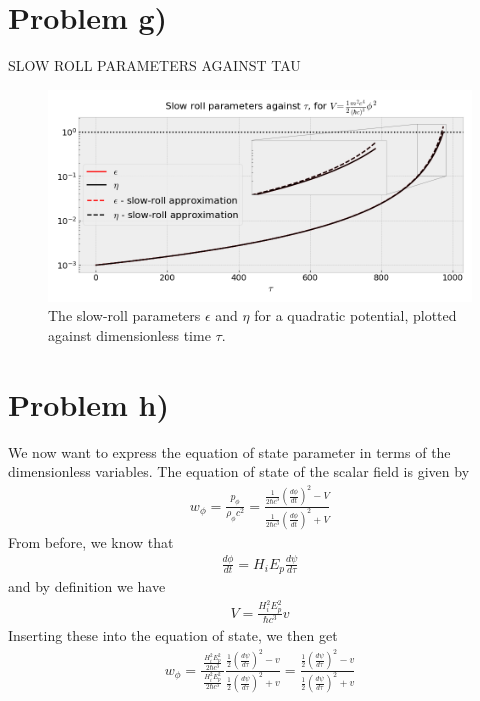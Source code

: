 \documentclass[reprint,english,notitlepage]{revtex4-1}  %
\numberwithin{equation}{section}
\begin{document}
\section{Problem g)}
SLOW ROLL PARAMETERS AGAINST TAU
\begin{figure}[h!]
	\includegraphics[width=\linewidth]{QuadraticPotential_slowroll-tau.png}
	\caption{The slow-roll parameters $\epsilon$ and $\eta$ for a quadratic potential,
	plotted against dimensionless time $\tau$.}
	\label{}
\end{figure}

\section{Problem h)}
We now want to express the equation of state parameter in terms of the
dimensionless variables. The equation of state of the scalar field is given by
\begin{align}
 w_\phi =	\frac{p_\phi}{\rho_\phi c^2}
	= \frac{ \frac{1}{2\hbar c^3}\left(\frac{d\phi}{dt}\right)^2 - V }
				 { \frac{1}{2\hbar c^3}\left(\frac{d\phi}{dt}\right)^2 + V }
\end{align}
From before, we know that
\begin{align}
	\frac{d\phi}{dt} = H_i E_p \frac{d\psi}{d\tau}
\end{align}
and by definition we have
\begin{align}
	V = \frac{H_i^2 E_p^2}{\hbar c^3} v
\end{align}
Inserting these into the equation of state, we then get
\begin{align}
	w_\phi
	 = \frac{\ \frac{H_i^2E_p^2}{2\hbar c^3} \ }{\frac{H_i^2E_p^2}{2\hbar c^3}}
	 \frac{ \frac{1}{2}\left(\frac{d\psi}{d\tau}\right)^2 - v }
					{ \frac{1}{2}\left(\frac{d\psi}{d\tau}\right)^2	+ v }
	 = \frac{ \frac{1}{2}\left(\frac{d\psi}{d\tau}\right)^2 - v }
 				 { \frac{1}{2}\left(\frac{d\psi}{d\tau}\right)^2 + v }
\end{align}
\end{document}
